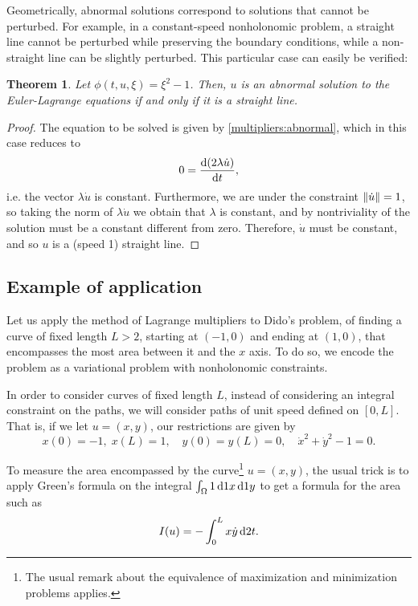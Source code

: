 \documentclass{article}
\theoremstyle{plain}
\newtheorem{theorem}{Theorem}
\theoremstyle{plain}
\theoremstyle{nonumberplain}
\newtheorem{proof}{Proof}
\theoremstyle{empty}
\DeclarePairedDelimiter\norm{\lVert}{\rVert}
\begin{document}
Geometrically, abnormal solutions correspond to solutions that cannot be perturbed. For example, in a constant-speed nonholonomic problem, a straight line cannot be perturbed while preserving the boundary conditions, while a non-straight line can be slightly perturbed. This particular case can easily be verified:

\begin{theorem}\label{abnormalline}
Let $\phi(t,u,\xi) = \xi^2 - 1$. Then, $u$ is an abnormal solution to the Euler-Lagrange equations if and only if it is a straight line.
\end{theorem}

\begin{proof}
The equation to be solved is given by \eqref{multipliers:abnormal}, which in this case reduces to
\[0 = \diff{(2 \lambda \dot u)}t,\]
i.e. the vector $\lambda \dot u$ is constant. Furthermore, we are under the constraint $\norm{\dot u} = 1$, so taking the norm of $\lambda \dot u$ we obtain that $\lambda$ is constant, and by nontriviality of the solution must be a constant different from zero. Therefore, $\dot u$ must be constant, and so $u$ is a (speed 1) straight line.
\end{proof}

\subsection{Example of application}

Let us apply the method of Lagrange multipliers to Dido's problem, of finding a curve of fixed length $L > 2$, starting at $(-1,0)$ and ending at $(1,0)$, that encompasses the most area between it and the $x$ axis. To do so, we encode the problem as a variational problem with nonholonomic constraints.

In order to consider curves of fixed length $L$, instead of considering an integral constraint on the paths, we will consider paths of unit speed defined on $[0,L]$. That is, if we let $u = (x,y)$, our restrictions are given by
\begin{equation}\label{initcond}
x(0) = -1,\; x(L) = 1, \quad y(0) = y(L) = 0, \quad \dot x^2 + \dot y^2 - 1 = 0.
\end{equation}

To measure the area encompassed by the curve\footnote{The usual remark about the equivalence of maximization and minimization problems applies.} $u = (x,y)$, the usual trick is to apply Green's formula on the integral $\int_\Omega 1 \dl1 x \dl1 y$ to get a formula for the area such as
\[I(u) = - \int_0^L x \dot y \dl2 t.\]
\end{document}
